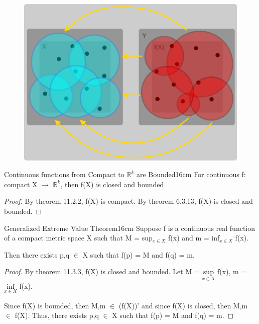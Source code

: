     \begin{figure}[h]
        \centering
        \includegraphics[scale=0.28]{Images/11.3.2.png}
    \end{figure}



    \begin{wtheorem}{Continuous functions from Compact to
    $\mathbb{R}^k$ are Bounded}{16cm}
        For continuous f: compact X $\rightarrow$ $\mathbb{R}^k$,
        then f(X) is closed and bounded
    \end{wtheorem}

    \begin{proof}
        By {\color{red} theorem 11.2.2}, f(X) is compact.
        By {\color{red} theorem 6.3.13}, f(X) is closed and bounded.
    \end{proof}

    \vspace{0.5cm}



    \begin{wtheorem}{Generalized Extreme Value Theorem}{16cm}
        Suppose f is a continuous real function of a compact metric space X
        such that M = sup$_{x \in X}$ f(x) and m = inf$_{x \in X}$ f(x).

        Then there exists p,q $\in$ X such that f(p) = M and f(q) = m.        
    \end{wtheorem}

    \begin{proof}
        By {\color{red} theorem 11.3.3}, f(X) is closed and bounded.
        Let M = $\underset{x \in X}{\text{sup}}$ f(x),
        m = $\underset{x \in X}{\text{inf}}$ f(x).

        Since f(X) is bounded, then M,m $\in$ (f(X))' and
        since f(X) is closed, then M,m $\in$ f(X).
        Thus, there exists p,q $\in$ X such that f(p) = M and f(q) = m.
    \end{proof}

